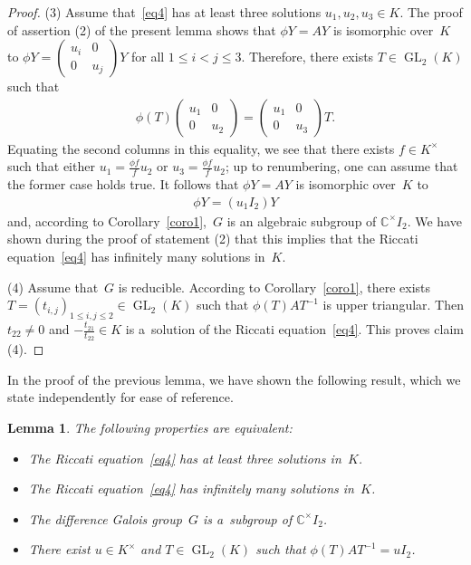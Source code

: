 \documentclass[10pt,a4paper]{amsart}
\numberwithin{equation}{section}
\newtheorem{Lemma}[Theorem]{Lemma}
\begin{document}
\begin{proof}
(3) Assume that~\eqref{eq4} has at least three solutions $u_{1},u_{2},u_{3}\in K$.
The proof of assertion (2) of the present lemma shows that $\phi Y=AY$ is isomorphic over~$K$ to $\phi Y=
\begin{pmatrix}
u_{i}&0
\\
0&u_{j}
\end{pmatrix}
Y$ for all $1\leq i<j \leq 3$.
Therefore, there exists $T \in \operatorname{GL}_{2}(K)$ such that
\begin{gather*}
\phi(T)
\begin{pmatrix}
u_{1}&0
\\
0&u_{2}
\end{pmatrix}
=
\begin{pmatrix}
u_{1}&0
\\
0&u_{3}
\end{pmatrix}
T.
\end{gather*}
Equating the second columns in this equality, we see that there exists ${f\in K^{\times}}$ such that either
$u_{1}=\frac{\phi f}{f}u_{2}$ or $u_{3}=\frac{\phi f}{f}u_{2}$; up to renumbering, one can assume that the former case
holds true.
It follows that $\phi Y=AY$ is isomorphic over~$K$ to
\begin{gather*}
\phi Y=(u_{1} I_{2}) Y
\end{gather*}
and, according to Corollary~\ref{coro1},~$G$ is an algebraic subgroup of $\mathbb C^{\times} I_{2}$.
We have shown during the proof of statement (2) that this implies that the Riccati equation~\eqref{eq4} has inf\/initely
many solutions in~$K$.

(4) Assume that~$G$ is reducible.
According to Corollary~\ref{coro1}, there exists $T=(t_{i,j})_{1 \leq i,j\leq 2}\in \operatorname{GL}_{2}(K)$ such that
$\phi(T)AT^{-1}$ is upper triangular.
Then $t_{22}\neq 0$ and $-\frac{t_{21}}{t_{22}}\in K$ is a~solution of the Riccati equation~\eqref{eq4}.
This proves claim (4).
\end{proof}

In the proof of the previous lemma, we have shown the following result, which we state independently for ease of
reference.

\begin{Lemma}
\label{lem ric irred bis}
The following properties are equivalent:
\begin{itemize}\itemsep=0pt
\item The Riccati equation~\eqref{eq4} has at least three solutions in~$K$.
\item The Riccati equation~\eqref{eq4} has infinitely many solutions in~$K$.
\item The difference Galois group~$G$ is a~subgroup of $\mathbb C^{\times}I_{2}$.
\item There exist $u \in K^{\times}$ and $T \in \operatorname{GL}_2(K)$ such that $\phi(T)AT^{-1} = u I_{2}$.
\end{itemize}
\end{Lemma}
\end{document}
